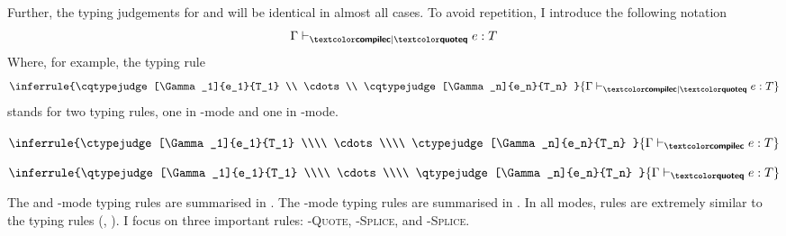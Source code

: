 \newcommand{\runtimecomptype}[2]{{#1}^0 \, ! \, {#2}}
\newcommand{\compiletimetype}[1]{{#1}^{-1}}
\newcommand{\compiletimecomptype}[2]{{#1}^{-1} ! {#2}}

Further, the typing judgements for \compilemode{} and \quotemode{} will be identical in almost all cases. To avoid repetition, I introduce the following notation
\[\cqtypejudge{e}{T}\]
Where, for example, the typing rule 
\[\inferrule{\cqtypejudge[\Gamma_1]{e_1}{T_1} \\ \cdots \\ \cqtypejudge[\Gamma_n]{e_n}{T_n} }{\cqtypejudge{e}{T}}\]
stands for two typing rules, one in \compilemode{}-mode and one in \quotemode{}-mode.
\begin{center}
\begin{minipage}[t]{0.3\textwidth}
  \centering 
  $\inferrule{\ctypejudge[\Gamma_1]{e_1}{T_1} \\\\ \cdots \\\\ \ctypejudge[\Gamma_n]{e_n}{T_n} }{\ctypejudge{e}{T}}$
\end{minipage}%
\begin{minipage}[t]{0.3\textwidth}
  \centering
  $\inferrule{\qtypejudge[\Gamma_1]{e_1}{T_1} \\\\ \cdots \\\\ \qtypejudge[\Gamma_n]{e_n}{T_n} }{\qtypejudge{e}{T}}$
\end{minipage}
\end{center}

The \compilemode{} and \quotemode{}-mode typing rules are summarised in . The \splicemode{}-mode typing rules are summarised in . In all modes, rules are extremely similar to the \efflang{} typing rules (, ). I focus on three important rules: \textsc{\splicemode{}-Quote}, \textsc{\quotemode{}-Splice}, and \textsc{\compilemode{}-Splice}. 


